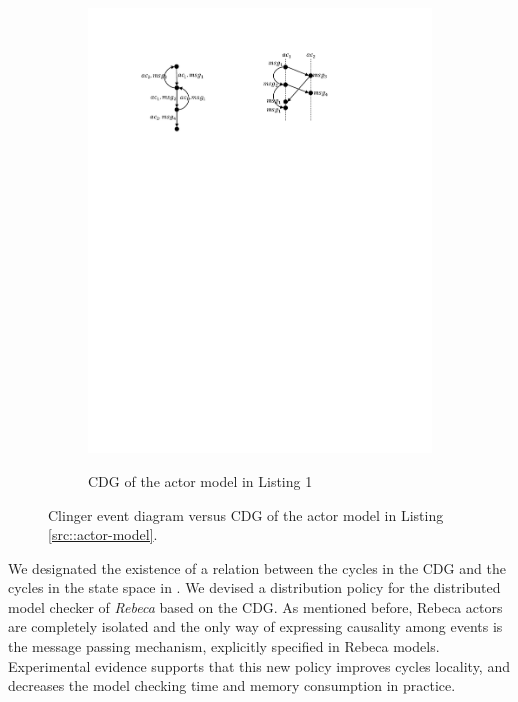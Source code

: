 \begin{figure}
\begin{subfigure}[b]{0.2\textwidth}
  \centering
  \small{
   \includegraphics[width=.8\textwidth]{resources/cdg.pdf}
  }
  \caption{CDG of the actor model in Listing 1}
  \label{fig::cdg}
\end{subfigure}
\caption{Clinger event diagram versus CDG of the actor model in Listing \ref{src::actor-model}.}
\label{fig::clinger-cdg}
\end{figure}

We designated the existence of a relation between the cycles in the CDG and the cycles in the state space in \cite{DBLP:journals/eceasst/KhamespanahSMSR15}. We devised a distribution policy for the distributed model checker of \emph{Rebeca} based on the CDG. As mentioned before, Rebeca actors are completely isolated and the only way of expressing causality among events is the message passing mechanism, explicitly specified in Rebeca models. Experimental evidence supports that this new policy improves cycles locality, and decreases the model checking time and memory consumption in practice.